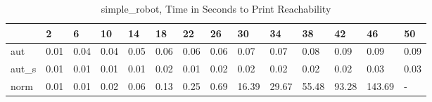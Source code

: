\begin{table}
\caption{simple_robot, Time in Seconds to Print Reachability}
\label{simple_robot_states_time}
\begin{tabular}{llllllllllllll}
\toprule
 & 2 & 6 & 10 & 14 & 18 & 22 & 26 & 30 & 34 & 38 & 42 & 46 & 50 \\
\midrule
aut & 0.01 & 0.04 & 0.04 & 0.05 & 0.06 & 0.06 & 0.06 & 0.07 & 0.07 & 0.08 & 0.09 & 0.09 & 0.09 \\
aut_s & 0.01 & 0.01 & 0.01 & 0.01 & 0.02 & 0.01 & 0.02 & 0.02 & 0.02 & 0.02 & 0.02 & 0.03 & 0.03 \\
norm & 0.01 & 0.01 & 0.02 & 0.06 & 0.13 & 0.25 & 0.69 & 16.39 & 29.67 & 55.48 & 93.28 & 143.69 & - \\
\bottomrule
\end{tabular}
\end{table}
